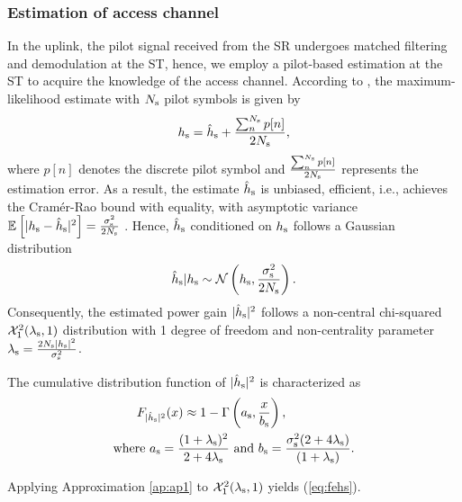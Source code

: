 \subsubsection{Estimation of access channel}
In the uplink, the pilot signal received from the SR undergoes matched filtering and demodulation at the ST, hence, we employ a pilot-based estimation at the ST to acquire the knowledge of the access channel. According to \cite{Gifford08}, the maximum-likelihood estimate with $N_{\text{s}}$ pilot symbols is given by 
\begin{align}
h_{\text{s}} = \hat{h}_{\text{s}} + \frac{\sum^{N_{\text{s}}}_{n} p[n]}{2 N_{\text{s}}},
\label{eq:pilot_MLE}
\end{align}
where $p[n]$ denotes the discrete pilot symbol and $\frac{\sum^{N_{\text{s}}}_{n} p[n]}{2 N_{\text{s}}}$ represents the estimation error.
As a result, the estimate $\hat{h}_{\text{s}}$ is unbiased, efficient, i.e., achieves the Cram\'er-Rao bound with equality, with asymptotic variance ${\mathbb E}_{}\left[ |h_{\text{s}} -\hat{h}_{\text{s}}|^2 \right] = \frac{\sigma^2_{\text{s}}}{2 N_{\text{s}}}$ \cite{Gifford08}. Hence, $\hat{h}_{\text{s}}$ conditioned on $h_{\text{s}}$ follows a Gaussian distribution
\begin{align}
\hat{h}_{\text{s}}|h_{\text{s}} \sim \mathcal{N}\left( h_{\text{s}},\frac{\sigma^2_{\text{s}}}{2 N_{\text{s}}} \right).
\label{eq:ehs} 
\end{align}
Consequently, the estimated power gain $|\hat{h}_{\text{s}}|^2$ follows a non-central chi-squared $\ncchi2(\ls, 1)$ distribution with 1 degree of freedom and non-centrality parameter $\lambda_{\text{s}} = \frac{2 N_{\text{s}} |h_{\text{s}}|^2}{\sigma^2_{\text{s}}}$. 
\begin{lemma} \label{lm:lm2}
\normalfont
The cumulative distribution function of $|\hat{h}_{\text{s}}|^2$ is characterized as 
\begin{align}
F_{|\hat{h}_{\text{s}}|^2}(x) \approx 1 - \Gamma&\left(a_{\text{s}}, \frac{x}{b_{\text{s}}}\right) \label{eq:fehs},\\ 
\text{where  } a_{\text{s}} = \frac{(1 + \lambda_{\text{s}})^2}{2 + 4 \lambda_{\text{s}}} &\text{ and } b_{\text{s}} = \frac{\sigma^2_{\text{s}} (2 + 4 \lambda_{\text{s}})}{(1 + \lambda_{\text{s}})}. \label{eq:para_s} 
\end{align} 
\end{lemma}
\begin{IEEEproof}
Applying Approximation \ref{ap:ap1} to $\ncchi2(\ls,1 )$ yields (\ref{eq:fehs}). 
\end{IEEEproof}

